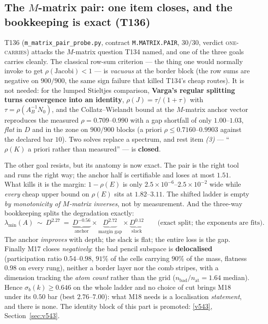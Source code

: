 \documentclass[11pt,a4paper]{article}
\begin{document}
\subsection{The $M$-matrix pair: one item closes, and the bookkeeping is exact (T136)}
T136 (\texttt{m\_matrix\_pair\_probe.py}, contract \texttt{M.MATRIX.PAIR}, $30/30$, verdict
\textsc{one-carries}) attacks the $M$-matrix question T134 named, and one of the three goals carries
cleanly. The classical row-sum criterion --- the thing one would normally invoke to get
$\rho(\mathrm{Jacobi})<1$ --- is \emph{vacuous} at the border block (the row sums are negative on
$900/900$, the same sign failure that killed T134's cheap routes). It is not needed: for the lumped
Stieltjes comparison, \textbf{Varga's regular splitting turns convergence into an identity},
$\rho(J)=\tau/(1+\tau)$ with $\tau=\rho(A_B^{-1}N_0)$, and the Collatz--Wielandt bound at the
$M$-matrix anchor vector reproduces the measured $\rho=0.709$--$0.990$ with a gap shortfall of only
$1.00$--$1.03$, \emph{flat} in $D$ and in the zone on $900/900$ blocks (a priori
$\rho\le0.7160$--$0.9903$ against the declared bar $10$). Two solves replace a spectrum, and rest item
\emph{(3)} --- ``$\rho(K)$ a priori rather than measured'' --- is \textbf{closed}.

The other goal resists, but its anatomy is now exact. The pair is the right tool and runs the right
way; the anchor half is certifiable and loses at most $1.51$. What kills it is the margin: $1-\rho(E)$
is only $2.5\times10^{-6}$--$2.5\times10^{-2}$ wide while \emph{every} cheap upper bound on $\rho(E)$
sits at $1.82$--$3.11$. The shifted ladder is empty \emph{by monotonicity of $M$-matrix inverses}, not
by measurement. And the three-way bookkeeping splits the degradation exactly:
\[
\lambda_{\min}(A)\ \sim\ D^{2.27}\ =\ \underbrace{D^{-0.56}}_{\text{anchor}}\times
\underbrace{D^{2.72}}_{\text{margin gap}}\times\underbrace{D^{0.12}}_{\text{slack}}
\qquad\text{(exact split; the exponents are fits).}
\]
The anchor \emph{improves} with depth; the slack is flat; the entire loss is the gap. Finally M17
closes \emph{negatively}: the bad pencil subspace is \textbf{delocalised} (participation ratio
$0.54$--$0.98$, $91\%$ of the cells carrying $90\%$ of the mass, flatness $0.98$ on every rung),
neither a border layer nor the comb stripes, with a dimension tracking the \emph{atom count} rather
than the grid ($n_{\mathrm{bad}}/n_{\mathrm{at}}=1.64$ median). Hence $\sigma_b(k)\ge0.646$ on the
whole ladder and no choice of cut brings M18 under its $0.50$ bar (best $2.76$--$7.00$): what M18 needs
is a localisation \emph{statement}, and there is none. The identity block of this part is promoted:
\vref{v543}, Section~\ref{sec:v543}.
\end{document}
